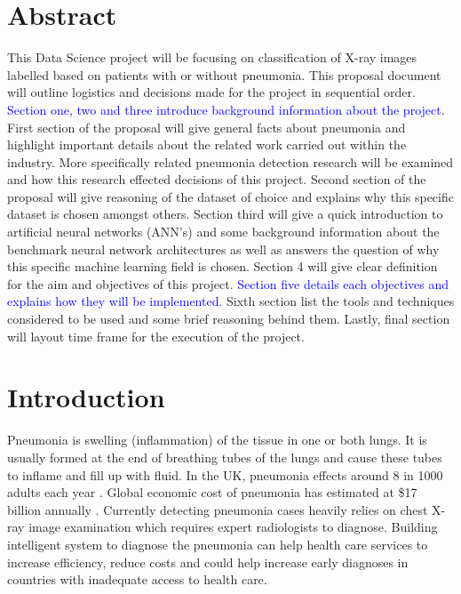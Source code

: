 \documentclass[12pt, twoside, a4paper]{article}
\begin{document}
\section*{Abstract}
This Data Science project will be focusing on classification of X-ray images labelled based on patients with or without pneumonia. This proposal document will outline logistics and decisions made for the project in sequential order. \textcolor{blue}{Section one, two and three introduce background information about the project.} First section of the proposal will give general facts about pneumonia and highlight important details about the related work carried out within the industry. More specifically related pneumonia detection research will be examined and how this research effected decisions of this project. Second section of the proposal will give reasoning of the dataset of choice and explains why this specific dataset is chosen amongst others. Section third will give a quick introduction to artificial neural networks (ANN's) and some background information about the benchmark neural network architectures as well as answers the question of why this specific machine learning field is chosen. Section 4 will give clear definition for the aim and objectives of this project. \textcolor{blue}{Section five details each objectives and explains how they will be implemented.} Sixth section list the tools and techniques considered to be used and some brief reasoning behind them. Lastly, final section will layout time frame for the execution of the project. 

\clearpage

\tableofcontents
\thispagestyle{empty}
\cleardoublepage
    

\setcounter{page}{1}


\section{Introduction}

Pneumonia is swelling (inflammation) of the tissue in one or both lungs. It is usually formed at the end of breathing tubes of the lungs and cause these tubes to inflame and fill up with fluid. In the UK, pneumonia effects around 8 in 1000 adults each year \cite{nhs}. Global economic cost of pneumonia has estimated at \$17 billion annually \cite{cost}. Currently detecting pneumonia cases heavily relies on chest X-ray image examination which requires expert radiologists to diagnose. Building intelligent system to diagnose the pneumonia can help  health care services to increase efficiency, reduce costs and could help increase early diagnoses in countries with inadequate access to health care.
\end{document}
